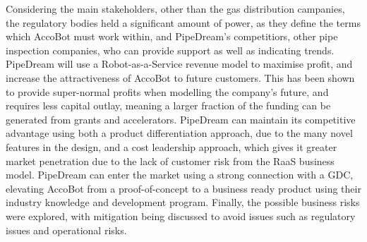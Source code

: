 \documentclass[11pt]{article}		%
\newcommand{\supercite}[1]{\textsuperscript{\cite{#1}}}		%
\begin{document}
        Considering the main stakeholders, other than the gas distribution campanies, the regulatory bodies held a significant amount of power, as they define the terms which AccoBot must work within, and PipeDream's competitiors, other pipe inspection companies, who can provide support as well as indicating trends.
        PipeDream will use a Robot-as-a-Service revenue model to maximise profit, and increase the attractiveness of AccoBot to future customers.
        This has been shown to provide super-normal profits when modelling the company's future, and requires less capital outlay, meaning a larger fraction of the funding can be generated from grants and accelerators.
        PipeDream can maintain its competitive advantage using both a product differentiation approach, due to the many novel features in the design, and a cost leadership approach, which gives it greater market penetration due to the lack of customer risk from the RaaS business model.
        PipeDream can enter the market using a strong connection with a GDC, elevating AccoBot from a proof-of-concept to a business ready product using their industry knowledge and development program.
        Finally, the possible business risks were explored, with mitigation being discussed to avoid issues such as regulatory issues and operational risks.
        
         

	\pagebreak		%
	
	
	
	
	\begin{multicols}{2}
		\begingroup\onehalfspacing
			{\tiny
				
				
			}
		\endgroup
	\end{multicols}
	
\end{document}
